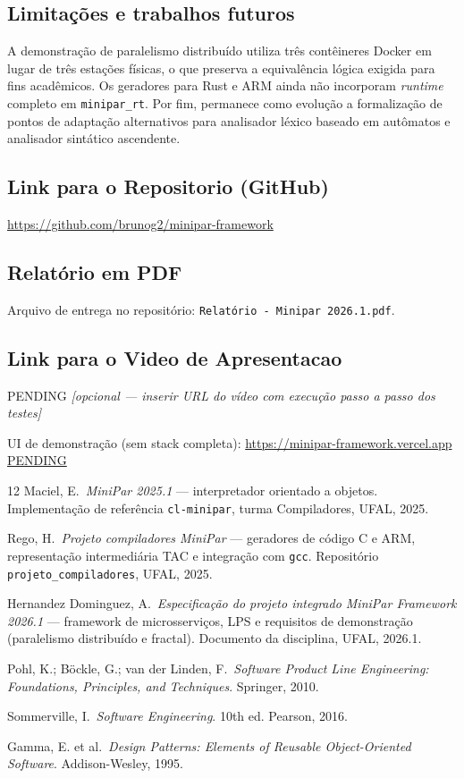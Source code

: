 \documentclass[12pt]{article}
\newcommand{\CoverReportPDFFile}{Relatório - Minipar 2026.1.pdf}
\newcommand{\CoverGitHubURL}{https://github.com/brunog2/minipar-framework}
\newcommand{\CoverVideoURL}{PENDING}
\newcommand{\CoverVideoPending}{\textit{[opcional --- inserir URL do vídeo com execução passo a passo dos testes]}}
\begin{document}
\subsection{Limitações e trabalhos futuros}
A demonstração de paralelismo distribuído utiliza três contêineres Docker em lugar de três estações físicas, o que preserva a equivalência lógica exigida para fins acadêmicos. Os geradores para Rust e ARM ainda não incorporam \emph{runtime} completo em \texttt{minipar\_rt}. Por fim, permanece como evolução a formalização de pontos de adaptação alternativos para analisador léxico baseado em autômatos e analisador sintático ascendente.

\subsection{Link para o Repositorio (GitHub)}
\url{\CoverGitHubURL}

\subsection{Relatório em PDF}
Arquivo de entrega no repositório: \texttt{\CoverReportPDFFile}.

\subsection{Link para o Video de Apresentacao}
\ifx\CoverVideoURL\PENDING
\CoverVideoPending

\noindent UI de demonstração (sem stack completa): \url{https://minipar-framework.vercel.app}
\else
\url{\CoverVideoURL}
\fi

\appendix





\begin{thebibliography}{12}
Maciel, E.\ \emph{MiniPar 2025.1} --- interpretador orientado a objetos. Implementação de referência \texttt{cl-minipar}, turma Compiladores, UFAL, 2025.

Rego, H.\ \emph{Projeto compiladores MiniPar} --- geradores de código C e ARM, representação intermediária TAC e integração com \texttt{gcc}. Repositório \texttt{projeto\_compiladores}, UFAL, 2025.

Hernandez Dominguez, A.\ \emph{Especificação do projeto integrado MiniPar Framework 2026.1} --- framework de microsserviços, LPS e requisitos de demonstração (paralelismo distribuído e fractal). Documento da disciplina, UFAL, 2026.1.

Pohl, K.; Böckle, G.; van der Linden, F.\ \emph{Software Product Line Engineering: Foundations, Principles, and Techniques}. Springer, 2010.

Sommerville, I.\ \emph{Software Engineering}. 10th ed. Pearson, 2016.

Gamma, E. et al.\ \emph{Design Patterns: Elements of Reusable Object-Oriented Software}. Addison-Wesley, 1995.
\end{thebibliography}
\end{document}
